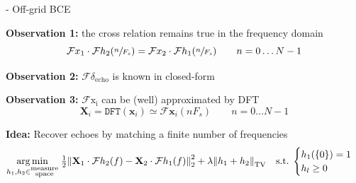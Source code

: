 \begin{frame}{\blaster - Off-grid BCE}
    \begin{block}{\textbf{Observation 1:} the cross relation remains true in the frequency domain}
        \begin{equation*}
            \mathcal{F}x_1 \cdot \mathcal{F}h_2 (\sfrac{n}{F_s}) = \mathcal{F}x_2 \cdot \mathcal{F}h_1(\sfrac{n}{F_s}) \qquad n=0\dots N-1
        \end{equation*}
        \end{block}

        \vspace{.5em}

        \begin{block}{\textbf{Observation 2:} $\mathcal{F}\delta_{\mathrm{echo}}$ is known in closed-form}
        \end{block}

        \vspace{1.em}

        \begin{block}{\textbf{Observation 3:} $\mathcal{F}{\mathrm{x_i}}$ can be (well) approximated by DFT}
        \begin{equation*}
            \mathbf{X}_i = \texttt{DFT}(\mathbf{x}_i) \simeq  \mathcal{F}{\mathbf{x}_i}(nF_s) \qquad n=0\dots N-1
        \end{equation*}
        \end{block}



        \begin{block}{\textbf{Idea:} Recover echoes by matching a finite number of frequencies}
        \begin{equation*}
            \underset{h_1,h_2 \in \substack{\text{measure} \\ \text{space}}}{\arg\min} \;
            \tfrac{1}{2} \kvvbar{
                \mathbf{X}_1 \cdot \mathcal{F}h_2 (f) - \mathbf{X}_2 \cdot \mathcal{F}h_1(f)
            }_2^2
            + \lambda \kvvbar{h_1 + h_2}_{\mathrm{TV}}
            \quad
            \text{s.t.}\;
            \begin{cases}
                h_1(\{0\})=1 \\
                h_l \geq 0
                \end{cases}
        \end{equation*}
        \end{block}


\end{frame}
